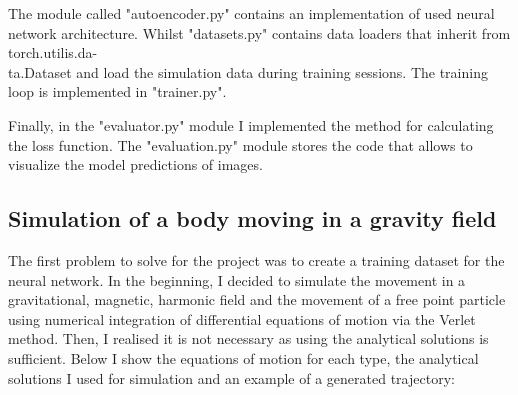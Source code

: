 \documentclass[12pt,letterpaper]{article}
\begin{document}
The module called "autoencoder.py" contains an implementation of used neural network architecture. Whilst "datasets.py" contains data loaders that inherit from torch.utilis.da-\\ta.Dataset and load the simulation data during training sessions. The training loop is implemented in "trainer.py".

Finally, in the "evaluator.py" module I implemented the method for calculating the loss function. The "evaluation.py" module stores the code that allows to visualize the model predictions of images.

\subsection{Simulation of a body moving in a gravity field}

The first problem to solve for the project was to create a training dataset for the neural network. In the beginning, I decided to simulate the movement in a gravitational, magnetic, harmonic field and the movement of a free point particle using numerical integration of differential equations of motion via the Verlet method. Then, I realised it is not necessary as using the analytical solutions is sufficient. Below I show the equations of motion for each type, the analytical solutions I used for simulation and an example of a generated trajectory:
\end{document}
